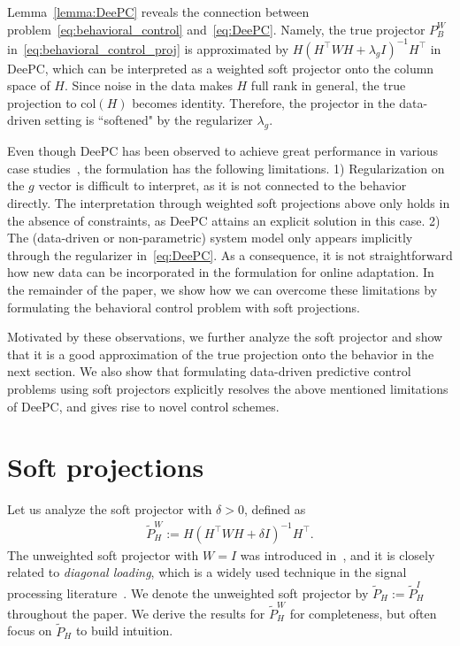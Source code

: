 \documentclass[letterpaper, 10 pt, conference]{ieeeconf}
\begin{document}
Lemma~\ref{lemma:DeePC} reveals the connection between problem~\eqref{eq:behavioral_control} and~\eqref{eq:DeePC}.
Namely, the true projector $P_B^W$ in~\eqref{eq:behavioral_control_proj} is approximated by $H(H^\top W H + \lambda_g I)^{-1} H^\top$ in \gls{DeePC}, which can be interpreted as a weighted soft projector onto the column space of $H$.
Since noise in the data makes $H$ full rank in general, the true projection to $\mathrm{col}(H)$ becomes identity.
Therefore, the projector in the data-driven setting is ``softened" by the regularizer $\lambda_g$.


Even though \gls{DeePC} has been observed to achieve great performance in various case studies~\cite{dorfler2022bridging,markovsky2021behavioral}, the formulation has the following limitations.
1) Regularization on the $g$ vector is difficult to interpret, as it is not connected to the  behavior directly.
The interpretation through weighted soft projections above only holds in the absence of constraints, as \gls{DeePC} attains an explicit solution in this case. 
2) The (data-driven or non-parametric) system model only appears implicitly through the regularizer in~\eqref{eq:DeePC}. 
As a consequence, it is not straightforward how new data can be incorporated in the formulation for online adaptation.
In the remainder of the paper, we show how we can overcome these limitations by formulating the behavioral control problem with soft projections.

Motivated by these observations, we further analyze the soft projector and show that it is a good approximation of the true projection onto the behavior in the next section.
We also show that formulating data-driven predictive control problems using soft projectors explicitly resolves the above mentioned limitations of \gls{DeePC}, and gives rise to novel control schemes.




\section{Soft projections} \label{sec:soft_proj}
Let us analyze the soft projector with $\delta>0$, defined as
\begin{align} \label{eq:soft_proj}
    \tilde{P}_H^W := H(H^\top W H + \delta I)^{-1} H^\top.
\end{align}
The unweighted soft projector with $W=I$ was introduced in~\cite{wax2021detection,wax2022vector,wax2023robust}, and it is closely related to \textit{diagonal loading}, which is a widely used technique in the signal processing literature~\cite{van2002optimum}.
We denote the unweighted soft projector by $\tilde{P}_H := \tilde{P}_H^I$ throughout the paper.
We derive the results for $\tilde{P}_H^W$ for completeness, but often focus on $\tilde{P}_H$ to build intuition.
\end{document}
